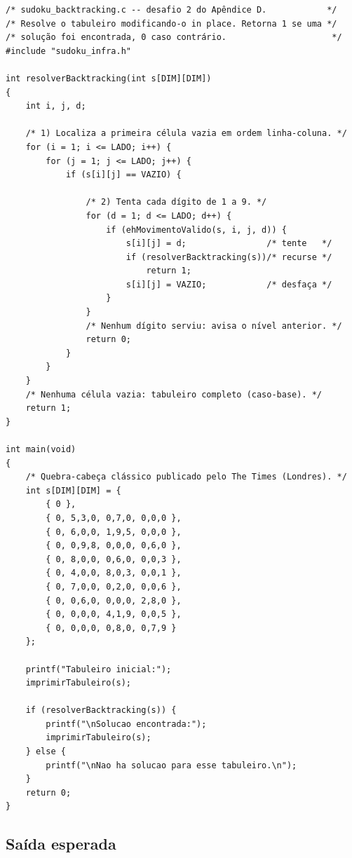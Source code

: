 \documentclass[11pt,a4paper,oneside]{report}
\begin{document}
\begin{lstlisting}[caption={Solucionador por força bruta com retrocesso.},label={lst:bt}]
/* sudoku_backtracking.c -- desafio 2 do Apêndice D.            */
/* Resolve o tabuleiro modificando-o in place. Retorna 1 se uma */
/* solução foi encontrada, 0 caso contrário.                     */
#include "sudoku_infra.h"

int resolverBacktracking(int s[DIM][DIM])
{
    int i, j, d;

    /* 1) Localiza a primeira célula vazia em ordem linha-coluna. */
    for (i = 1; i <= LADO; i++) {
        for (j = 1; j <= LADO; j++) {
            if (s[i][j] == VAZIO) {

                /* 2) Tenta cada dígito de 1 a 9. */
                for (d = 1; d <= LADO; d++) {
                    if (ehMovimentoValido(s, i, j, d)) {
                        s[i][j] = d;                /* tente   */
                        if (resolverBacktracking(s))/* recurse */
                            return 1;
                        s[i][j] = VAZIO;            /* desfaça */
                    }
                }
                /* Nenhum dígito serviu: avisa o nível anterior. */
                return 0;
            }
        }
    }
    /* Nenhuma célula vazia: tabuleiro completo (caso-base). */
    return 1;
}

int main(void)
{
    /* Quebra-cabeça clássico publicado pelo The Times (Londres). */
    int s[DIM][DIM] = {
        { 0 },
        { 0, 5,3,0, 0,7,0, 0,0,0 },
        { 0, 6,0,0, 1,9,5, 0,0,0 },
        { 0, 0,9,8, 0,0,0, 0,6,0 },
        { 0, 8,0,0, 0,6,0, 0,0,3 },
        { 0, 4,0,0, 8,0,3, 0,0,1 },
        { 0, 7,0,0, 0,2,0, 0,0,6 },
        { 0, 0,6,0, 0,0,0, 2,8,0 },
        { 0, 0,0,0, 4,1,9, 0,0,5 },
        { 0, 0,0,0, 0,8,0, 0,7,9 }
    };

    printf("Tabuleiro inicial:");
    imprimirTabuleiro(s);

    if (resolverBacktracking(s)) {
        printf("\nSolucao encontrada:");
        imprimirTabuleiro(s);
    } else {
        printf("\nNao ha solucao para esse tabuleiro.\n");
    }
    return 0;
}
\end{lstlisting}

\subsection{Saída esperada}
\end{document}
